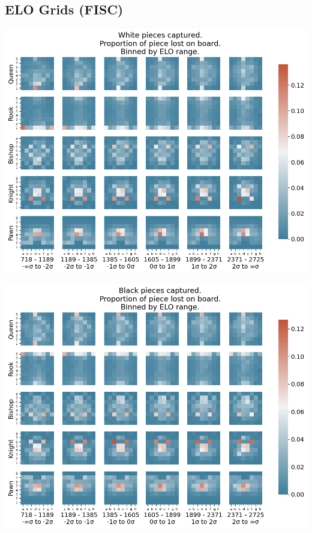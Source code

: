 \documentclass[11pt]{article}
\begin{document}
\subsection{ELO Grids (FISC)}
\label{sec:orge7d6145}
\begin{center}
\includegraphics[width=\textwidth]{Images/_HEATMAP_Queen_Rook_Bishop_Knight_Pawn_WHITE_ELO_FISC.png}
\end{center}

\begin{center}
\includegraphics[width=\textwidth]{Images/_HEATMAP_Queen_Rook_Bishop_Knight_Pawn_BLACK_ELO_FISC.png}
\end{center}
\end{document}
